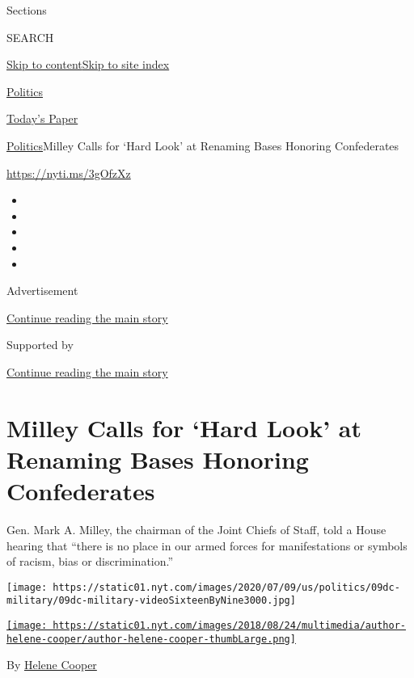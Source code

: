 Sections

SEARCH

\protect\hyperlink{site-content}{Skip to
content}\protect\hyperlink{site-index}{Skip to site index}

\href{https://www.nytimes.com/section/politics}{Politics}

\href{https://myaccount.nytimes.com/auth/login?response_type=cookie\&client_id=vi}{}

\href{https://www.nytimes.com/section/todayspaper}{Today's Paper}

\href{/section/politics}{Politics}\textbar{}Milley Calls for `Hard Look'
at Renaming Bases Honoring Confederates

\url{https://nyti.ms/3gOfzXz}

\begin{itemize}
\item
\item
\item
\item
\item
\end{itemize}

Advertisement

\protect\hyperlink{after-top}{Continue reading the main story}

Supported by

\protect\hyperlink{after-sponsor}{Continue reading the main story}

\hypertarget{milley-calls-for-hard-look-at-renaming-bases-honoring-confederates}{%
\section{Milley Calls for `Hard Look' at Renaming Bases Honoring
Confederates}\label{milley-calls-for-hard-look-at-renaming-bases-honoring-confederates}}

Gen. Mark A. Milley, the chairman of the Joint Chiefs of Staff, told a
House hearing that ``there is no place in our armed forces for
manifestations or symbols of racism, bias or discrimination.''

\texttt{[image: https://static01.nyt.com/images/2020/07/09/us/politics/09dc-military/09dc-military-videoSixteenByNine3000.jpg]}

\href{https://www.nytimes.com/by/helene-cooper}{\texttt{[image: https://static01.nyt.com/images/2018/08/24/multimedia/author-helene-cooper/author-helene-cooper-thumbLarge.png]}}

By \href{https://www.nytimes.com/by/helene-cooper}{Helene Cooper}

